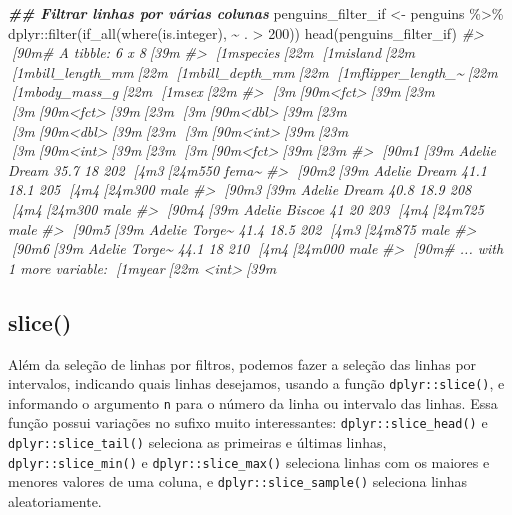 \documentclass[
]{book}
\newenvironment{Shaded}{\begin{snugshade}}{\end{snugshade}}
\newcommand{\CommentTok}[1]{\textcolor[rgb]{0.37,0.37,0.37}{\textit{#1}}}
\newcommand{\DecValTok}[1]{\textcolor[rgb]{0.06,0.06,0.06}{#1}}
\newcommand{\DocumentationTok}[1]{\textcolor[rgb]{0.37,0.37,0.37}{\textbf{\textit{#1}}}}
\newcommand{\FunctionTok}[1]{\textcolor[rgb]{0,0,0}{#1}}
\newcommand{\NormalTok}[1]{#1}
\newcommand{\OtherTok}[1]{\textcolor[rgb]{0.37,0.37,0.37}{#1}}
\newcommand{\SpecialCharTok}[1]{\textcolor[rgb]{0,0,0}{#1}}
\begin{document}
\begin{Shaded}
\begin{Highlighting}[]
\DocumentationTok{\#\# Filtrar linhas por várias colunas}
\NormalTok{penguins\_filter\_if }\OtherTok{\textless{}{-}}\NormalTok{ penguins }\SpecialCharTok{\%\textgreater{}\%} 
\NormalTok{  dplyr}\SpecialCharTok{::}\FunctionTok{filter}\NormalTok{(}\FunctionTok{if\_all}\NormalTok{(}\FunctionTok{where}\NormalTok{(is.integer), }\SpecialCharTok{\textasciitilde{}}\NormalTok{ . }\SpecialCharTok{\textgreater{}} \DecValTok{200}\NormalTok{))}
\FunctionTok{head}\NormalTok{(penguins\_filter\_if)}
\CommentTok{\#\textgreater{} [90m\# A tibble: 6 x 8[39m}
\CommentTok{\#\textgreater{}   [1mspecies[22m [1misland[22m [1mbill\_length\_mm[22m [1mbill\_depth\_mm[22m [1mflipper\_length\_\textasciitilde{}[22m [1mbody\_mass\_g[22m [1msex[22m  }
\CommentTok{\#\textgreater{}   [3m[90m\textless{}fct\textgreater{}[39m[23m   [3m[90m\textless{}fct\textgreater{}[39m[23m           [3m[90m\textless{}dbl\textgreater{}[39m[23m         [3m[90m\textless{}dbl\textgreater{}[39m[23m            [3m[90m\textless{}int\textgreater{}[39m[23m       [3m[90m\textless{}int\textgreater{}[39m[23m [3m[90m\textless{}fct\textgreater{}[39m[23m}
\CommentTok{\#\textgreater{} [90m1[39m Adelie  Dream            35.7          18                202        [4m3[24m550 fema\textasciitilde{}}
\CommentTok{\#\textgreater{} [90m2[39m Adelie  Dream            41.1          18.1              205        [4m4[24m300 male }
\CommentTok{\#\textgreater{} [90m3[39m Adelie  Dream            40.8          18.9              208        [4m4[24m300 male }
\CommentTok{\#\textgreater{} [90m4[39m Adelie  Biscoe           41            20                203        [4m4[24m725 male }
\CommentTok{\#\textgreater{} [90m5[39m Adelie  Torge\textasciitilde{}           41.4          18.5              202        [4m3[24m875 male }
\CommentTok{\#\textgreater{} [90m6[39m Adelie  Torge\textasciitilde{}           44.1          18                210        [4m4[24m000 male }
\CommentTok{\#\textgreater{} [90m\# ... with 1 more variable: [1myear[22m \textless{}int\textgreater{}[39m}
\end{Highlighting}
\end{Shaded}

\hypertarget{slice}{%
\subsection{slice()}\label{slice}}

Além da seleção de linhas por filtros, podemos fazer a seleção das linhas por intervalos, indicando quais linhas desejamos, usando a função \texttt{dplyr::slice()}, e informando o argumento \texttt{n} para o número da linha ou intervalo das linhas. Essa função possui variações no sufixo muito interessantes: \texttt{dplyr::slice\_head()} e \texttt{dplyr::slice\_tail()} seleciona as primeiras e últimas linhas, \texttt{dplyr::slice\_min()} e \texttt{dplyr::slice\_max()} seleciona linhas com os maiores e menores valores de uma coluna, e \texttt{dplyr::slice\_sample()} seleciona linhas aleatoriamente.
\end{document}
